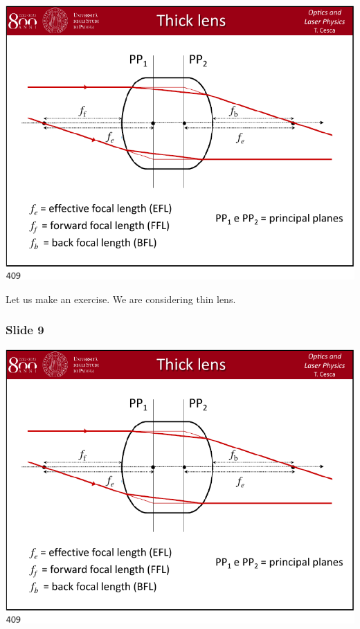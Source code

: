 \documentclass[../main/main.tex]{subfiles}
\begin{document}
\begin{minipage}[]{0.5\linewidth}
\centering
\includegraphics[page=8,width=1\textwidth]{../lessons/pdf_file/20_lecture.pdf}
\end{minipage}
\hspace{0.3cm}\vspace{0.3cm}
\begin{minipage}[c]{0.47\linewidth}

Let us make an exercise.
We are considering thin lens.

\end{minipage}

\subsubsection*{Slide 9}

\begin{minipage}[]{0.5\linewidth}
\centering
\includegraphics[page=9,width=1\textwidth]{../lessons/pdf_file/20_lecture.pdf}
\end{minipage}
\hspace{0.3cm}\vspace{0.3cm}
\begin{minipage}[c]{0.47\linewidth}


\end{minipage}
\end{document}
